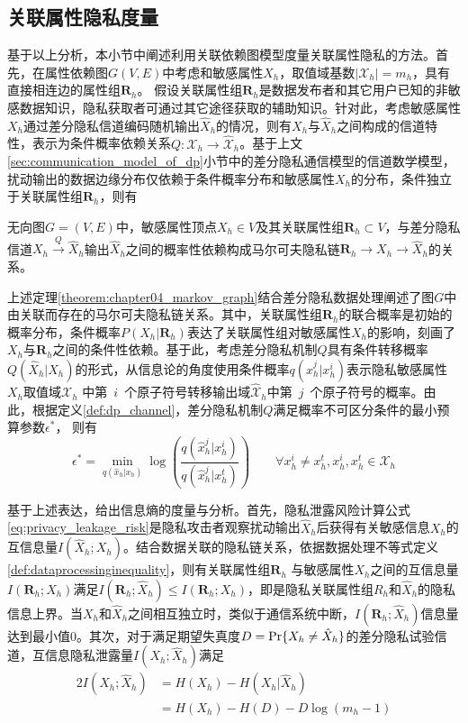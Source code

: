 \subsection{关联属性隐私度量}
基于以上分析，本小节中阐述利用关联依赖图模型度量关联属性隐私的方法。首先，在属性依赖图$G(V,E)$中考虑和敏感属性$X_h$，取值域基数$|\mathcal{X}_h|=m_h$，具有直接相连边的属性组$\bm{R}_{h}$。 假设关联属性组$\bm{R}_{h}$是数据发布者和其它用户已知的非敏感数据知识，隐私获取者可通过其它途径获取的辅助知识。针对此，考虑敏感属性$X_h$通过差分隐私信道编码随机输出$\hat{X}_h$的情况，则有$X_h$与$\hat{X}_h$之间构成的信道特性，表示为条件概率依赖关系$Q:\mathcal{X}_h\rightarrow\hat{\mathcal{X}}_h$。基于上文\ref{sec:communication_model_of_dp}小节中的差分隐私通信模型的信道数学模型，扰动输出的数据边缘分布仅依赖于条件概率分布和敏感属性$X_h$的分布，条件独立于关联属性组$\bm{R}_{h}$，则有
\begin{theorem} \label{theorem:chapter04_markov_graph}
	无向图$G=(V,E)$中，敏感属性顶点$X_h \in V$及其关联属性组$\bm{R}_h\subset V$，与差分隐私信道$X_h \xrightarrow{Q} \hat{X}_{h}$输出$\hat{X}_{h}$之间的概率性依赖构成马尔可夫隐私链$\bm{R}_{h}\rightarrow X_{h}\rightarrow\hat{X}_{h}$的关系。
\end{theorem}

上述定理\ref{theorem:chapter04_markov_graph}结合差分隐私数据处理阐述了图$G$中由关联而存在的马尔可夫隐私链关系。其中，关联属性组$\bm{R}_{h}$的联合概率是初始的概率分布，条件概率$P(X_{h}|\bm{R}_{h})$表达了关联属性组对敏感属性$X_h$的影响，刻画了$X_h$与$\bm{R}_h$之间的条件性依赖。基于此，考虑差分隐私机制$Q$具有条件转移概率$Q(\hat{X}_h|X_h)$的形式，从信息论的角度使用条件概率$q(\hat{x}_{h}^{j}|x_{h}^{i})$表示隐私敏感属性$X_h$取值域$\mathcal{X}_h$ 中第~$i$~个原子符号转移输出域$\mathcal{\hat{X}}_h$中第~$j$~个原子符号的概率。由此，根据定义\ref{def:dp_channel}，差分隐私机制$Q$满足概率不可区分条件的最小预算参数$\epsilon^*$，
则有
\begin{equation}\label{eq:epsilon_2.10}
	\epsilon^{*}=\min_{q(\hat{x}_h|x_h)}\log \left(\frac {q(\hat{x}_{h}^{j}|x_{h}^{i})}{q(\hat{x}_{h}^{j}|x_{h}^{t})}\right) \qquad \forall x_h^i \neq x_h^t, x_h^i , x_h^t\in \mathcal{X}_h
\end{equation}

基于上述表达，给出信息熵的度量与分析。首先，隐私泄露风险计算公式\ref{eq:privacy_leakage_risk}是隐私攻击者观察扰动输出$\hat{X}_h$后获得有关敏感信息$X_h$的互信息量$I(\hat{X}_h;X_h)$。结合数据关联的隐私链关系，依据数据处理不等式定义\ref{def:dataprocessinginequality}，则有关联属性组$\bm{R}_h$ 与敏感属性$X_h$之间的互信息量$I(\bm{R}_h;X_h)$满足$I(\bm{R}_h;\hat{X}_h) \leq I(\bm{R}_h;X_h)$，即是隐私关联属性组$R_h$和$\hat{X}_h$的隐私信息上界。当$X_h$和$\hat{X}_h$之间相互独立时，类似于通信系统中断，$I(\bm{R}_h;\hat{X}_h)$信息量达到最小值$0$。其次，对于满足期望失真度$D={\rm Pr}\{X_h \neq \hat{X}_h\}$的差分隐私试验信道，互信息隐私泄露量$I(X_h;\hat{X}_h)$满足
\begin{alignat}{2}
	I(X_h;\hat{X}_h) & =H(X_h)-H(X_h|\hat{X}_h) \label{eq:entropty_2.10}\\
	 & = H(X_h)-H(D)-D\log(m_h-1) \label{eq:2.11}
\end{alignat}

